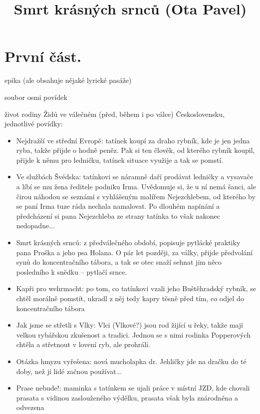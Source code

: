 \documentclass{article}
\title{\vspace{-2cm}Smrt krásných srnců (Ota Pavel)\vspace{-2cm}}
\date{}
\author{}
\begin{document}
\maketitle
\section{První část.}
\begin{description}
    \setlength\itemsep{0.15em}
    \item[druh:] epika (ale obsahuje nějaké lyrické pasáže)
    \item[žánr:] soubor osmi povídek
    \item[téma:] život rodiny Židů ve válečném (před, během i po válce) Československu, jednotlivé povídky:
    \begin{itemize}
    \item Nejdražší ve střední Evropě: tatínek koupí za draho rybník, kde je jen jedna ryba, takže přijde o hodně peněz. Pak si ten člověk, od kterého rybník koupil, přijde k němu pro ledničku, tatínek situace využije a tak se pomstí.
   	\item Ve službách Švédska: tatínkovi se náramně daří prodávat ledničky a vysavače a líbí se mu žena ředitele podniku Irma. Uvědomuje si, že u ní nemá šanci, ale čirou náhodou se seznámí s vyhlášeným malířem Nejezchlebem, od kterého by se paní Irma tuze ráda nechala namalovat. Po dlouhém napínání a předcházení si pana Nejezchleba ze strany tatínka to však nakonec nedopadne...
   	\item Smrt krásných srnců: z předválečného období, popisuje pytlácké praktiky pana Proška a jeho psa Holana. O pár let později, za války, přijde předvolání synů do koncentračního tábora, a tak se otec snaží sehnat jim něco posledního k snědku -- pytlačí srnce.
   	\item Kapři pro wehrmacht: po tom, co tatínkovi vzali jeho Buštěhradský rybník, se chtěl morálně pomstít, ukradl z něj tedy kapry těsně před tím, co odjel do koncentračního tábora
   	\item Jak jsme se střetli s Vlky: Vlci (Vlkové?) jsou rod žijící u řeky, takže mají velkou rybářskou zkušenost a tradici. Jednou se s nimi rodinka Popperových chtěla a střetnout v lovení ryb, ale prohráli.
   	\item Otázka hmyzu vyřešena: nová mucholapka dr. Jehličky jde na dračku do té doby, než ji lidé začnou používat...
   	\item Prase nebude!: maminka s tatínkem se ujali práce v místní JZD, kde chovali prasata s vidinou zaslouženého výdělku, prasata však byla znárodněna a odvezena

\end{itemize}
\end{description}
\end{document}

